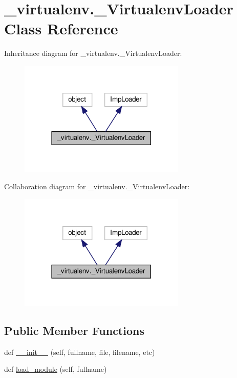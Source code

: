 \hypertarget{class__virtualenv_1_1__VirtualenvLoader}{}\section{\+\_\+virtualenv.\+\_\+\+Virtualenv\+Loader Class Reference}
\label{class__virtualenv_1_1__VirtualenvLoader}


Inheritance diagram for \+\_\+virtualenv.\+\_\+\+Virtualenv\+Loader\+:
\nopagebreak
\begin{figure}[H]
\begin{center}
\leavevmode
\includegraphics[width=225pt]{class__virtualenv_1_1__VirtualenvLoader__inherit__graph}
\end{center}
\end{figure}


Collaboration diagram for \+\_\+virtualenv.\+\_\+\+Virtualenv\+Loader\+:
\nopagebreak
\begin{figure}[H]
\begin{center}
\leavevmode
\includegraphics[width=225pt]{class__virtualenv_1_1__VirtualenvLoader__coll__graph}
\end{center}
\end{figure}
\subsection*{Public Member Functions}
\begin{DoxyCompactItemize}
\item 
def \hyperlink{class__virtualenv_1_1__VirtualenvLoader_a4611e5bf5e1d70408eab80c0c87f9bba}{\+\_\+\+\_\+init\+\_\+\+\_\+} (self, fullname, file, filename, etc)
\item 
def \hyperlink{class__virtualenv_1_1__VirtualenvLoader_ad03c12435e090cf72ae08888d2c51c75}{load\+\_\+module} (self, fullname)
\end{DoxyCompactItemize}



